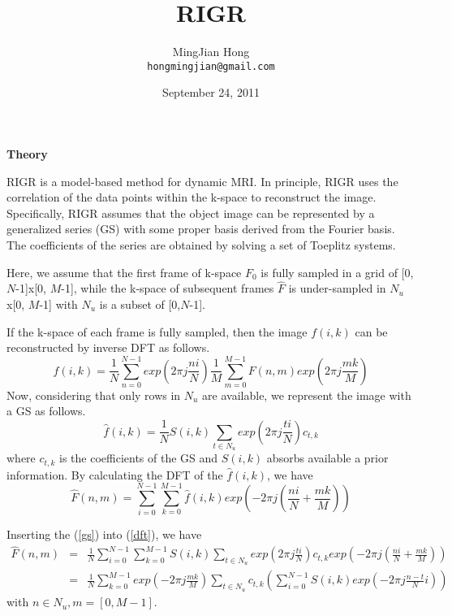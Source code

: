 \documentclass[12pt,a4paper]{article}
\begin{document}
\begin{CJK}{UTF8}{songti}

\title{RIGR}
\author{MingJian Hong \\ \texttt{hongmingjian@gmail.com}}
\date{September 24, 2011} %
\maketitle

\textbf{Theory}

RIGR is a model-based method for dynamic MRI. In principle, RIGR uses the correlation of the data points within the k-space to reconstruct the image. Specifically, RIGR assumes that the object image can be represented by a generalized series (GS) with some proper basis derived from the Fourier basis. The coefficients of the series are obtained by solving a set of Toeplitz systems.

Here, we assume that the first frame of k-space $F_0$ is fully sampled in a grid of [0,$N$-1]x[0, $M$-1], while the k-space of subsequent frames $\hat{F}$ is under-sampled in $N_u$x[0, $M$-1] with $N_u$ is a subset of [0,$N$-1].

If the k-space of each frame is fully sampled, then the image $f(i, k)$ can be reconstructed by inverse DFT as follows.
\begin{equation}
f(i, k)=\frac{1}{N}\sum_{n=0}^{N-1}exp(2 \pi j \frac{ni}{N})\frac{1}{M}\sum_{m=0}^{M-1}F(n,m)exp(2 \pi j \frac{mk}{M})
\end{equation}
Now, considering that only rows in $N_u$ are available, we represent the image with a GS as follows.
\begin{equation}
\hat{f}(i,k)=\frac{1}{N}S(i,k)\sum_{t \in N_u} exp(2 \pi j\frac{ti}{N}) c_{t,k}
\label{gs}
\end{equation}
where $c_{t,k}$ is the coefficients of the GS and $S(i,k)$ absorbs available a prior information. By calculating the DFT of the $\hat{f}(i, k)$, we have
\begin{equation}
\hat{F}(n, m)=\sum_{i=0}^{N-1}\sum_{k=0}^{M-1}\hat{f}(i,k)exp(-2 \pi j(\frac{ni}{N}+\frac{mk}{M}))
\label{dft}
\end{equation}

Inserting the (\ref{gs}) into (\ref{dft}), we have
\begin{eqnarray*}
\hat{F}(n, m) & = & \frac{1}{N}\sum_{i=0}^{N-1}\sum_{k=0}^{M-1} S(i,k)\sum_{t \in N_u} exp(2 \pi j \frac{ti}{N}) c_{t,k} exp(-2 \pi j(\frac{ni}{N}+\frac{mk}{M})) \\
              & = & \frac{1}{N}\sum_{k=0}^{M-1}exp(-2 \pi j\frac{mk}{M})\sum_{t \in N_u}c_{t,k} (\sum_{i=0}^{N-1}S(i,k)exp(-2 \pi j\frac{n-t}{N}i))
\end{eqnarray*}
with $n \in N_u, m=[0, M-1]$.


\end{CJK}
\end{document}
